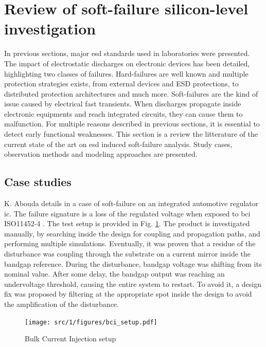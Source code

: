 \section{Review of soft-failure silicon-level investigation}

In previous sections, major \gls{esd} standards used in laboratories were presented.
The impact of electrostatic discharges on electronic devices has been detailed, highlighting two classes of failures.
Hard-failures are well known and multiple protection strategies exists, from external devices and ESD protections, to distributed protection architectures and much more.
Soft-failures are the kind of issue caused by electrical fast transients.
When discharges propagate inside electronic equipments and reach integrated circuits, they can cause them to malfunction.
For multiple reasons described in previous sections, it is essential to detect early functional weaknesses.
This section is a review the litterature of the current state of the art on \gls{esd} induced soft-failure analysis.
Study cases, observation methods and modeling approaches are presented.

\subsection{Case studies}

K. Abouda details in \cite{softfailEMCIC} a case of soft-failure on an integrated automotive regulator \gls{ic}.
The failure signature is a loss of the regulated voltage when exposed to \gls{bci} ISO11452-4 \cite{iso11452}.
The test setup is provided in Fig. \ref{fig:bci-setup}.
The product is investigated manually, by searching inside the design for coupling and propagation paths, and performing multiple simulations.
Eventually, it was proven that a residue of the disturbance was coupling through the substrate on a current mirror inside the bandgap reference.
During the disturbance, bandgap voltage was shifting from its nominal value.
After some delay, the bandgap output was reaching an undervoltage threshold, causing the entire system to restart.
To avoid it, a design fix was proposed by filtering at the appropriate spot inside the design to avoid the amplification of the disturbance.

\begin{figure}[!h]
  \centering
  \texttt{[image: src/1/figures/bci\_setup.pdf]}
  \caption{Bulk Current Injection setup}
  \label{fig:bci-setup}
\end{figure}

